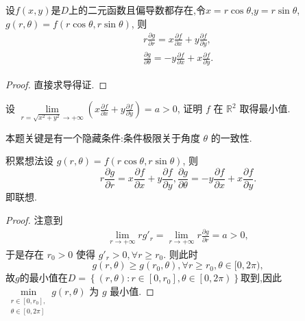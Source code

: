 \documentclass[../../main.tex]{subfiles}%
\begin{document}
\begin{proposition}\label{proposition:极坐标变换偏导数相关结论}
设$f(x,y)$是$D$上的二元函数且偏导数都存在,令$x=r\cos \theta$,$y=r\sin \theta$,\( g(r, \theta) = f(r \cos \theta, r \sin \theta) \), 则
\begin{gather*}
r \frac{\partial g}{\partial r} = x \frac{\partial f}{\partial x} + y \frac{\partial f}{\partial y},
\\
\frac{\partial g}{\partial \theta} = -y \frac{\partial f}{\partial x} + x \frac{\partial f}{\partial y}.
\end{gather*}
\end{proposition}
\begin{proof}
直接求导得证.
\end{proof}

\begin{example}
设 \( \lim\limits_{r = \sqrt{x^2 + y^2} \to +\infty} \left( x \frac{\partial f}{\partial x} + y \frac{\partial f}{\partial y} \right) = a > 0 \), 证明 \( f \) 在 \( \mathbb{R}^2 \) 取得最小值.
\end{example}
\begin{remark}
本题关键是有一个隐藏条件:条件极限关于角度 \( \theta \) 的一致性.
\end{remark}
\begin{note}
积累想法设 \( g(r, \theta) = f(r \cos \theta, r \sin \theta) \), 则
\[
r \frac{\partial g}{\partial r} = x \frac{\partial f}{\partial x} + y \frac{\partial f}{\partial y}, \frac{\partial g}{\partial \theta} = -y \frac{\partial f}{\partial x} + x \frac{\partial f}{\partial y}.
\]
即联想.
\end{note}
\begin{proof}
注意到
\begin{align*}
\lim\limits_{r \to +\infty} r g'_r = \lim\limits_{r \to +\infty} r \frac{\partial g}{\partial r}= a > 0,
\end{align*}
于是存在 \( r_0 > 0 \) 使得 \( g'_r > 0, \forall r \geqslant r_0 \). 则此时
\[
g(r, \theta) \geqslant g(r_0, \theta), \forall r \geqslant r_0, \theta \in [0, 2\pi),
\]
故$g$的最小值在$D=\left\{ \left( r,\theta \right) :r\in \left[ 0,r_0 \right] ,\theta \in \left[ 0,2\pi \right) \right\}$取到,因此\( \min\limits_{\substack{r \in [0, r_0], \\ \theta \in [0, 2\pi]}} g(r, \theta) \) 为 \( g \) 最小值.
\end{proof}
\end{document}
